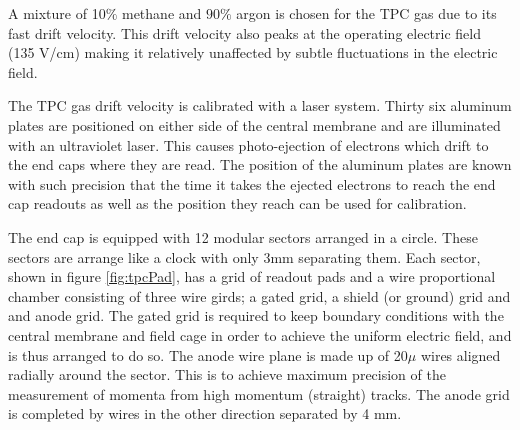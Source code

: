 \documentclass[abstract = on,listof=totoc, bibliography=totoc]{scrreprt}
\begin{document}
A mixture of 10$\%$ methane and $90\%$ argon is chosen for the TPC gas due to its fast drift velocity. This drift velocity also peaks at the operating electric field (135 V/cm) making it relatively unaffected by subtle fluctuations in the electric field.

The TPC gas drift velocity is calibrated with a laser system. Thirty six aluminum plates are positioned on either side of the central membrane and are illuminated with an ultraviolet laser. This causes photo-ejection of electrons which drift to the end caps where they are read. The position of the aluminum plates are known with such precision that the time it takes the ejected electrons to reach the end cap readouts as well as the position they reach can be used for calibration. 

The end cap is equipped with 12 modular sectors arranged in a circle. These sectors are arrange like a clock with only 3mm separating them. Each sector, shown in figure \ref{fig:tpcPad}, has a grid of readout pads and a wire proportional chamber consisting of three wire girds; a gated grid, a shield (or ground) grid and and anode grid. The gated grid is required to keep boundary conditions with the central membrane and field cage in order to achieve the uniform electric field, and is thus arranged to do so. The anode wire plane is made up of 20$\mu$ wires aligned radially around the sector. This is to achieve maximum precision of the measurement of momenta from high momentum (straight) tracks. The anode grid is completed by wires in the other direction separated by 4 mm.
\end{document}
